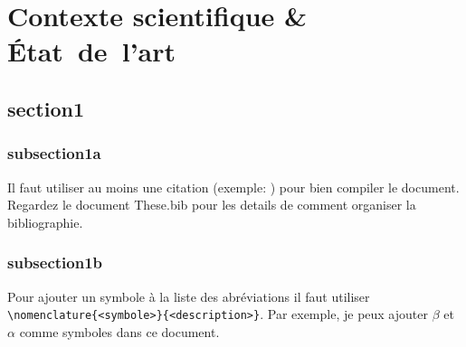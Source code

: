 \documentclass[a4paper,11pt,twoside]{StyleThese}
\begin{document}
\setcounter{chapter}{0} %
\dominitoc
\faketableofcontents
\fi

\chapter{Contexte scientifique \& État~de~l'art}
\minitoc

\section{section1}
\subsection{subsection1a}

Il faut utiliser au moins une citation (exemple: \cite{loche_safe_2020}) pour bien
compiler le document. Regardez le document These.bib pour les details de
comment organiser la bibliographie.

\subsection{subsection1b}

Pour ajouter un symbole à la liste des abréviations il faut utiliser
\verb|\nomenclature{<symbole>}{<description>}|. Par exemple, je peux ajouter
$\beta$ et
$\alpha$ comme
symboles dans ce document.

\ifdefined{}
\else


\end{document}
